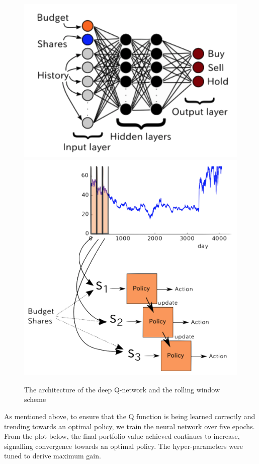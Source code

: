 \documentclass[12pt, authoryear]{elsarticle}
\begin{document}
\begin{figure}[h!]
	\begin{center} 
	\caption{The architecture of the deep Q-network and the rolling window scheme}
	\includegraphics[scale=0.6]{figures/ss_nn.png}
	\includegraphics[scale=0.4]{figures/roling_window.png}
	\label{fig_ss_nn}
	\end{center} 
\end{figure}

As mentioned above, to ensure that the Q function is being learned correctly and trending towards an optimal policy, we train the neural network over five epochs. From the plot below, the final portfolio value achieved continues to increase, signalling convergence towards an optimal policy. The hyper-parameters were tuned to derive maximum gain. 
\end{document}
